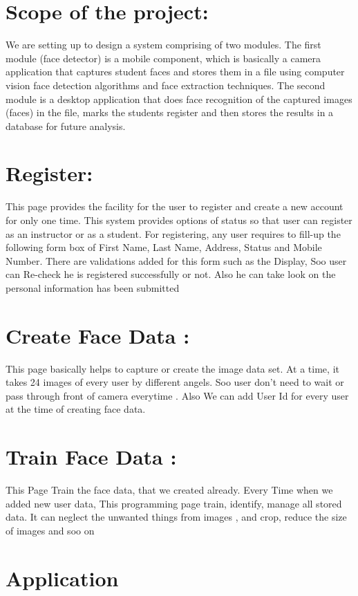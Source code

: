 \section{Scope of the project: }
We are setting up to design a system comprising of two modules. The first module (face detector) is a mobile component, which is basically a camera application that captures student faces and stores them in a file using computer vision face detection algorithms and face extraction techniques. The second module is a desktop application that does face recognition of the captured images (faces) in the file, marks the students register and then stores the results in a database for future analysis. 
\newpage

\section{Register:}

This page provides the facility for the user to register and create a new account for only one time. This system provides
options of status so that user can register as an instructor or as a student. For registering, any user requires to fill-up the
following form box of First Name, Last Name, Address, Status and Mobile Number.
There are validations added for this form such as the Display, Soo user can Re-check he is registered successfully or not.
Also he can take look on the personal information has been submitted
         


\newpage
\section{Create Face Data :}
This page basically helps to capture or create the image data set. At a time, it takes 24 images of every user by different
angels. Soo user don’t need to wait or pass through front of camera everytime .
Also We can add User Id for every user at the time of creating face data.
\newpage
\section{Train Face Data :}
This Page Train the face data, that we created already. Every Time when we added new user data, This programming
page train, identify, manage all stored data. It can neglect the unwanted things from images , and crop, reduce the size of
images and soo on
\newpage
\section{Application}
